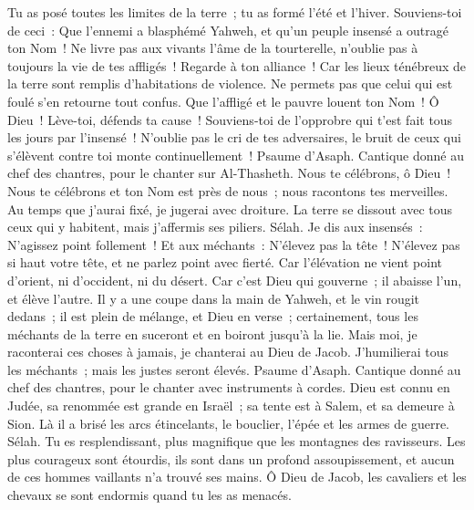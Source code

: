 \begin{multicols}{2}
Tu as posé toutes les limites de la terre~; tu as formé l'été et l'hiver.
Souviens-toi de ceci~: Que l'ennemi a blasphémé Yahweh, et qu'un peuple insensé a outragé ton Nom~!
Ne livre pas aux vivants l'âme de la tourterelle, n'oublie pas à toujours la vie de tes affligés~!
Regarde à ton alliance~! Car les lieux ténébreux de la terre sont remplis d'habitations de violence.
Ne permets pas que celui qui est foulé s'en retourne tout confus. Que l'affligé et le pauvre louent ton Nom~!
Ô Dieu~! Lève-toi, défends ta cause~! Souviens-toi de l'opprobre qui t'est fait tous les jours par l'insensé~!
N'oublie pas le cri de tes adversaires, le bruit de ceux qui s'élèvent contre toi monte continuellement~!
\VerseOne{}Psaume d'Asaph. Cantique donné au chef des chantres, pour le chanter sur Al-Thasheth.
Nous te célébrons, ô Dieu~! Nous te célébrons et ton Nom est près de nous~; nous racontons tes merveilles.
Au temps que j'aurai fixé, je jugerai avec droiture.
La terre se dissout avec tous ceux qui y habitent, mais j'affermis ses piliers. Sélah.
Je dis aux insensés~: N'agissez point follement~! Et aux méchants~: N'élevez pas la tête~!
N'élevez pas si haut votre tête, et ne parlez point avec fierté.
Car l'élévation ne vient point d'orient, ni d'occident, ni du désert.
Car c'est Dieu qui gouverne~; il abaisse l'un, et élève l'autre.
Il y a une coupe dans la main de Yahweh, et le vin rougit dedans~; il est plein de mélange, et Dieu en verse~; certainement, tous les méchants de la terre en suceront et en boiront jusqu'à la lie.
Mais moi, je raconterai ces choses à jamais, je chanterai au Dieu de Jacob.
J'humilierai tous les méchants~; mais les justes seront élevés.
\VerseOne{}Psaume d'Asaph. Cantique donné au chef des chantres, pour le chanter avec instruments à cordes.
Dieu est connu en Judée, sa renommée est grande en Israël~;
sa tente est à Salem, et sa demeure à Sion.
Là il a brisé les arcs étincelants, le bouclier, l'épée et les armes de guerre. Sélah.
Tu es resplendissant, plus magnifique que les montagnes des ravisseurs.
Les plus courageux sont étourdis, ils sont dans un profond assoupissement, et aucun de ces hommes vaillants n'a trouvé ses mains.
Ô Dieu de Jacob, les cavaliers et les chevaux se sont endormis quand tu les as menacés.

\end{multicols}
